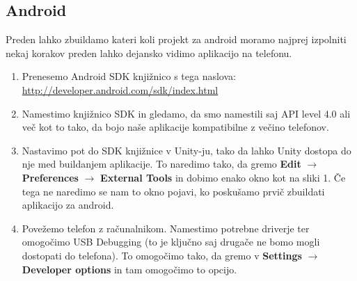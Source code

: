 {\color{indiagreen}\subsection{Android}}
Preden lahko zbuildamo kateri koli projekt za android moramo najprej izpolniti nekaj korakov preden lahko dejansko vidimo aplikacijo na telefonu.
\begin{enumerate}
	\item Prenesemo Android SDK knjižnico s tega naslova: \url{http://developer.android.com/sdk/index.html}
	\item Namestimo knjižnico SDK in gledamo, da smo namestili saj API level 4.0  ali več kot to tako, da bojo naše aplikacije kompatibilne z večino telefonov.
	\item Nastavimo pot do SDK knjižnice v Unity-ju, tako da lahko Unity dostopa do nje med buildanjem aplikacije. To naredimo tako, da gremo \textbf{Edit}  $\rightarrow$ \textbf{Preferences} $\rightarrow$ \textbf{External Tools} in dobimo enako okno kot na sliki 1. Če tega ne naredimo se nam to okno pojavi, ko poskušamo prvič zbuildati aplikacijo za android.
	\item Povežemo telefon z računalnikom. Namestimo potrebne driverje ter omogočimo USB Debugging (to je ključno saj drugače ne bomo mogli dostopati do telefona). To omogočimo tako, da gremo v \textbf{Settings}  $\rightarrow$ \textbf{Developer options} in tam omogočimo to opcijo.
\end{enumerate}